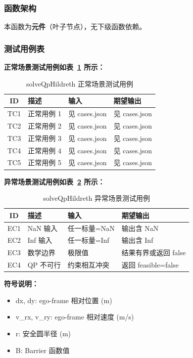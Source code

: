 \documentclass[a4paper,10pt]{article}
\begin{document}
\subsubsection{函数架构}
\par 本函数为\textbf{元件}（叶子节点），无下级函数依赖。

\subsubsection{测试用例表}
\noindent\textbf{正常场景测试用例如表~\ref{tab:normal_solveQpHildreth} 所示：}
\begin{table}[h]
\centering
\caption{solveQpHildreth 正常场景测试用例}
\label{tab:normal_solveQpHildreth}
\begin{tabular}{|c|p{3.5cm}|p{3.5cm}|p{3.5cm}|}
\hline
ID & 描述 & 输入 & 期望输出 \\ \hline
  TC1 & 正常用例 1 & 见 cases.json & 见 cases.json \\ \hline
  TC2 & 正常用例 2 & 见 cases.json & 见 cases.json \\ \hline
  TC3 & 正常用例 3 & 见 cases.json & 见 cases.json \\ \hline
  TC4 & 正常用例 4 & 见 cases.json & 见 cases.json \\ \hline
  TC5 & 正常用例 5 & 见 cases.json & 见 cases.json \\ \hline
\end{tabular}
\end{table}

\noindent\textbf{异常场景测试用例如表~\ref{tab:abnormal_solveQpHildreth} 所示：}
\begin{table}[h]
\centering
\caption{solveQpHildreth 异常场景测试用例}
\label{tab:abnormal_solveQpHildreth}
\begin{tabular}{|c|p{3.5cm}|p{3.5cm}|p{3.5cm}|}
\hline
ID & 描述 & 输入 & 期望输出 \\ \hline
  EC1 & NaN 输入 & 任一标量=NaN & 输出含 NaN \\ \hline
  EC2 & Inf 输入 & 任一标量=Inf & 输出含 Inf \\ \hline
  EC3 & 数学边界 & 极限值 & 结果有界或返回 false \\ \hline
  EC4 & QP 不可行 & 约束相互冲突 & 返回 feasible=false \\ \hline
\end{tabular}
\end{table}

\noindent\textbf{符号说明：}
\begin{itemize}
  \item dx, dy: ego-frame 相对位置 (m)
  \item v\_rx, v\_ry: ego-frame 相对速度 (m/s)
  \item r: 安全圆半径 (m)
  \item B: Barrier 函数值
\end{itemize}
\end{document}
